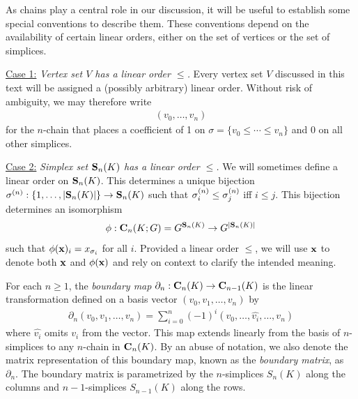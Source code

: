 \begin{remark}
\label{rmk:indexingchains}
As chains play a central role in our discussion, it will be useful to establish some special conventions to describe them.  These conventions depend on the availability of certain linear orders, either on the set of vertices or the set of simplices.

\noindent \underline{Case 1:} \emph{Vertex set $V$ has a linear order $\le$. }  Every vertex set $V$ discussed in this text will be assigned a (possibly arbitrary) linear order.  Without  risk of ambiguity, we may therefore write
    \begin{align*}
        (v_0, \ldots, v_n)
    \end{align*}
for the $n$-chain that places a coefficient of 1 on $\sigma = \{v_0 \leq \cdots \leq v_n\}$ and 0 on all other simplices. 

\noindent \underline{Case 2:} \emph{Simplex set $\mathbf{S}_n(K)$ has a linear order $\le$.}  We will sometimes define a linear order on $\mathbf{S}_n(K)$.  This determines a unique bijection  $\sigma ^{(n)}: \{1, \ldots, |\mathbf{S}_n(K)|\} \to  \mathbf{S}_n(K)$ such that $\sigma_i^{(n)} \le \sigma_j^{(n)}$ iff $i \le j$.  This bijection determines an isomorphism
    $$
        \phi: 
        \mathbf{C}_n(K;G) = G^{\mathbf{S}_n(K)}
        \to
        G^{|\mathbf{S}_n(K)|}
    $$
such that $\phi(\mathbf{x})_i = x_{\sigma_i}$ for all $i$.  
Provided a linear order $\le$,  we will use $\mathbf{x}$ to denote both $\mathbf{x}$ and $\phi(\mathbf{x})$ and rely on context to clarify the  intended meaning.
\end{remark}


  

For each $n\geq 1$, the \textit{boundary map} $\partial_n: \mathbf{C}_n(K) \rightarrow \mathbf{C}_{n-1}(K)$ is the linear transformation defined on a basis vector  $(v_0, v_1, \ldots, v_n)$ by 
    \begin{align*}
    \textstyle
        \partial_n(v_0, v_1, \ldots, v_n) = \sum_{i=0}^n (-1)^i (v_0, \ldots, \hat{v_i}, \ldots, v_n)
    \end{align*}
where $\hat{v_i}$ omits $v_i$ from the vector. This map extends linearly from the basis of $n$-simplices to any $n$-chain in $\mathbf{C}_n(K)$. By an abuse of notation, we also denote the matrix representation of this boundary map, known as the \textit{boundary matrix}, as $\partial_n$. The boundary matrix is parametrized by the $n$-simplices $S_n(K)$ along the columns and $n-1$-simplices $S_{n-1}(K)$ along the rows. 


